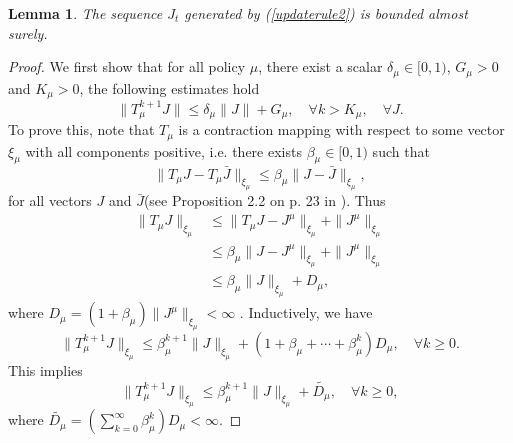 \documentclass[12pt,a4paper]{amsart}
\numberwithin{equation}{section}
\theoremstyle{plain}
\newtheorem{Lemma}[Th]{Lemma}
\theoremstyle{definition}
\begin{document}
\begin{Lemma}\label{lmbounded2}
	The sequence $J_t$ generated by (\ref{updaterule2}) is bounded almost surely. 
\end{Lemma}
\begin{proof}
	We first show that for all policy $\mu$, there exist a scalar $\delta_{\mu} \in [0, 1)$,  $G_{\mu} > 0$ and $K_{\mu} > 0$, the following estimates hold
	\begin{equation} \label{wnb}
	\|T_{\mu}^{k+1} J\|  \le \delta_{\mu} \| J\| + G_{\mu}, \quad \forall k > K_{\mu}, \quad \forall J .
	\end{equation}
	To prove this, note that $T_{\mu}$ is a contraction mapping with respect to some vector $\xi_{\mu}$ with all components positive, i.e. there exists $\beta_{\mu} \in [0,1)$ such that 
	$$
	\|T_{\mu}J - T_{\mu} \bar{J}\|_{\xi_{\mu}}  \le \beta_{\mu} \|J - \bar{J}\|_{\xi_{\mu}},
	$$
	for all vectors $J$ and $\bar{J}$(see Proposition 2.2 on p. 23 in \cite{BertsekasTsitsiklis96}). Thus
	\begin{equation} \label{wnb2}
		\begin{aligned}
		\|T_{\mu} J\|_{\xi_{\mu}} & \le \|T_{\mu} J - J^{\mu}\|_{\xi_{\mu}} + \|J^{\mu}\|_{\xi_{\mu}} \\
		& \le \beta_{\mu} \| J - J^{\mu}\|_{\xi_{\mu}} + \|J^{\mu}\|_{\xi_{\mu}} \\
		& \le \beta_{\mu}\|J\|_{\xi_{\mu}} + D_{\mu},
		\end{aligned}
	\end{equation}
	where $D_{\mu} = (1+\beta_{\mu})\|J^{\mu}\|_{\xi_{\mu}} < \infty$ .  Inductively, we have
	$$
	\|T_{\mu}^{k + 1} J\|_{\xi_{\mu}} \le \beta_{\mu}^{k+1} \|J\|_{\xi_{\mu}} + (1+ \beta_{\mu} + \cdots + \beta_{\mu}^k)D_{\mu}, \quad \forall k \ge 0.
	$$
	This implies
	$$
	\|T_{\mu}^{k + 1} J\|_{\xi_{\mu}} \le \beta_{\mu}^{k+1} \|J\|_{\xi_{\mu}} + \tilde{D_{\mu}}, \quad \forall k \ge 0,
	$$
	where $\tilde{D_{\mu}} = (\sum_{k=0}^{\infty} \beta_{\mu}^k) D_{\mu} < \infty$.
	

\end{proof}
\end{document}
